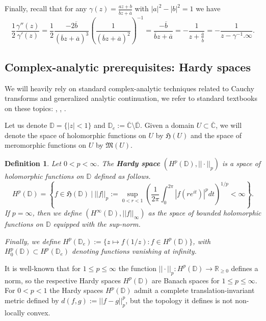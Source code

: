 \documentclass[11pt]{article}
\newtheorem{definition}{Definition}[section]
\begin{document}
Finally, recall that for any $\gamma(z) = \frac{a z + b}{\overline{b} z + \overline{a}}$ with $|a|^2 - |b|^2 = 1$ we have
\begin{equation}
	\label{poles of the log derivative}
		\frac{1}{2} \frac{\gamma''(z)}{\gamma'(z)} = \frac{1}{2} \frac{-2\overline{b}}{(\overline{b}z + \overline{a})^3} \left( \frac{1}{(\overline{b}z + \overline{a})^2}\right)^{-1} = \frac{- \overline{b}}{\overline{b}z + \overline{a}} = - \frac{1}{z + \frac{\overline{a}}{\overline{b}}} = - \frac{1}{z - \gamma^{-1}.\infty}.
\end{equation}

\subsection{Complex-analytic prerequisites: Hardy spaces}
We will heavily rely on standard complex-analytic techniques related to Cauchy transforms and generalized analytic continuation, we refer to standard textbooks on these topics: \cite{Shapiro1968}, \cite{cimahardy}, \cite{book:738388}.

Let us denote $\mathbb{D} = \{ |z| < 1 \}$ and $\mathbb{D}_e := \overline{\mathbb{C}} \setminus \overline{\mathbb{D}}$. Given a domain $U \subset \overline{\mathbb{C}}$, we will denote the space of holomorphic functions on $U$ by $\mathfrak{H}(U)$ and the space of meromorphic functions on $U$ by $\mathfrak{M}(U)$.

\begin{definition}
	Let $0 < p < \infty$. The \textbf{Hardy space} $(H^p(\mathbb{D}), || \cdot ||_p)$ is a space of holomorphic functions on $\mathbb{D}$ defined as follows.
	\[
	H^p(\mathbb{D}) = \left\lbrace  f \in \mathfrak{H}(\mathbb{D}) \ | \ ||f||_p := \sup_{0 < r < 1} \left( \frac{1}{2 \pi} \int_{0}^{2 \pi} |f(r e^{it})|^p dt \right)^{1/p} < \infty \right\rbrace.
	\] 
	If $p = \infty$, then we define $(H^\infty(\mathbb{D}), ||f||_\infty)$ as the space of bounded holomorphic functions on $\mathbb{D}$ equipped with the sup-norm.
	
	Finally, we define $H^p(\mathbb{D}_e) := \{ z \mapsto f(1/z) : f \in H^p(\mathbb{D})\}$, with $H^p_0(\mathbb{D}) \subset H^p(\mathbb{D}_e)$ denoting functions vanishing at infinity.
\end{definition} 

It is well-known that for $1 \le p \le \infty$ the function $||\cdot||_p : H^p(\mathbb{D}) \rightarrow \mathbb{R}_{\ge 0}$ defines a norm, so the respective Hardy spaces $H^p(\mathbb{D})$ are Banach spaces for $1 \le p \le \infty$. For $0 < p < 1$ the Hardy spaces $H^p(\mathbb{D})$ admit a complete translation-invariant metric defined by $d(f, g) := ||f - g||^p_p$, but the topology it defines is not non-locally convex.
\end{document}
